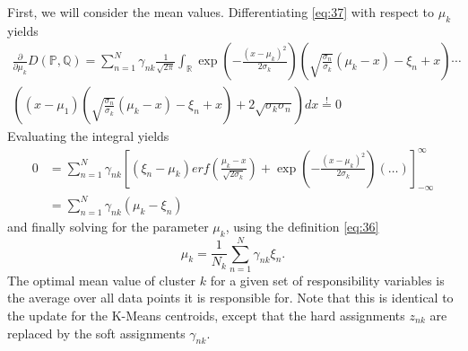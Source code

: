 First, we will consider the mean values.
Differentiating \eqref{eq:37} with respect to $\mu_k$ yields
\begin{multline}
  \label{eq:39}
  \frac{\partial }{\partial\mu_k}D(\mathbb{P,Q}) = \sum_{n=1}^N\gamma_{nk}\frac{1}{\sqrt{2\pi}}\int_\mathbb{R}\exp\left(-\frac{(x-\mu_k)^2}{2\sigma_k}\right)\left(\sqrt{\frac{\sigma_n}{\sigma_k}}(\mu_k-x)-\xi_n+x\right)\cdots\\ \left((x-\mu_1)\left(\sqrt{\frac{\sigma_n}{\sigma_k}}(\mu_k-x)-\xi_n+x\right)+2\sqrt{\sigma_k\sigma_n}\right)dx \overset{!}{=} 0
\end{multline}
Evaluating the integral  yields
\begin{align}
  \label{eq:40}
 0 &=\sum_{n=1}^N\gamma_{nk}\left[(\xi_n-\mu_k)erf\left(\frac{\mu_k-x}{\sqrt{2\sigma_k}}\right) + \exp\left(-\frac{(x-\mu_k)^2}{2\sigma_k}\right)\left(\ldots\right)\right]_{-\infty}^\infty\\
 &=\sum_{n=1}^N\gamma_{nk}(\mu_k-\xi_n)
\end{align}
and finally solving for the parameter $\mu_k$, using the definition \eqref{eq:36}
\begin{equation}
  \label{eq:41}
  \mu_k = \frac{1}{N_k}\sum_{n=1}^N\gamma_{nk}\xi_n.
\end{equation}
The optimal mean value of cluster $k$ for a given set of responsibility variables is the average over all data points it is responsible for.
Note that this is identical to the update for the K-Means centroids, except that the hard assignments $z_{nk}$ are replaced by the soft assignments $\gamma_{nk}$.

